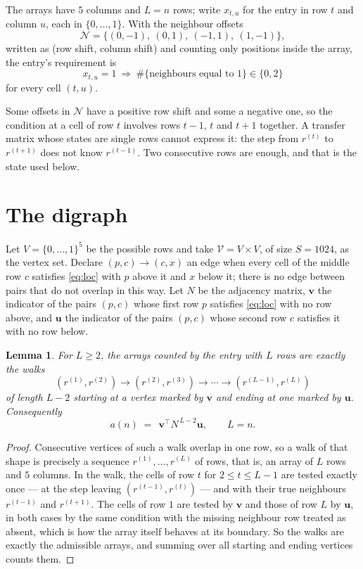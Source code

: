 \documentclass[11pt,a4paper]{article}
\theoremstyle{plain}
\newtheorem{lemma}[theorem]{Lemma}
\theoremstyle{definition}
\begin{document}
The arrays have $5$ columns and $L=n$ rows; write $x_{t,u}$ for the entry in
row $t$ and column $u$, each in $\{0,\dots,1\}$. With the neighbour offsets
\[
\mathcal N=\{(0,-1),\ (0,1),\ (-1,1),\ (1,-1)\},
\]
written as (row shift, column shift) and counting only positions inside the array, the
entry's requirement is
\begin{equation}\label{eq:loc}
x_{t,u}=1\ \Rightarrow\ \#\{\text{neighbours equal to }1\}\in\{0,2\}
\end{equation}
for every cell $(t,u)$.

Some offsets in $\mathcal N$ have a positive row shift and some a negative one, so the
condition at a cell of row $t$ involves rows $t-1$, $t$ and $t+1$ together. A transfer
matrix whose states are single rows cannot express it: the step from $r^{(t)}$ to
$r^{(t+1)}$ does not know $r^{(t-1)}$. Two consecutive rows are enough, and that is
the state used below.

\section{The digraph}

Let $V=\{0,\dots,1\}^{5}$ be the possible rows and take
$\mathcal V=V\times V$, of size $S=1024$, as the vertex set. Declare $(p,c)\to(c,x)$ an edge
when every cell of the middle row $c$ satisfies \eqref{eq:loc} with $p$ above it and $x$
below it; there is no edge between pairs that do not overlap in this way. Let $N$ be the
adjacency matrix, $\mathbf{v}$ the indicator of the pairs $(p,c)$ whose first row $p$
satisfies \eqref{eq:loc} with no row above, and $\mathbf{u}$ the indicator of
the pairs $(p,c)$ whose second row $c$ satisfies it with no row below.

\begin{lemma}\label{lem:walk}
For $L\ge2$, the arrays counted by the entry with $L$ rows are exactly the walks
\[
(r^{(1)},r^{(2)})\to(r^{(2)},r^{(3)})\to\cdots\to(r^{(L-1)},r^{(L)})
\]
of length $L-2$ starting at a vertex marked by $\mathbf{v}$ and ending at one marked by
$\mathbf{u}$. Consequently
\[
a(n)\;=\;\,\mathbf{v}^{\!\top}N^{\,L-2}\mathbf{u},\qquad L=n .
\]
\end{lemma}

\begin{proof}
Consecutive vertices of such a walk overlap in one row, so a walk of that shape is
precisely a sequence $r^{(1)},\dots,r^{(L)}$ of rows, that is, an array of $L$ rows
and $5$ columns. In the walk, the cells of row $t$ for $2\le t\le L-1$ are tested
exactly once --- at the step leaving $(r^{(t-1)},r^{(t)})$ --- and with their true
neighbours $r^{(t-1)}$ and $r^{(t+1)}$. The cells of row $1$ are tested by
$\mathbf{v}$ and those of row $L$ by $\mathbf{u}$, in both cases by the same condition
with the missing neighbour row treated as absent, which is how the array itself behaves at
its boundary. So the walks are exactly the admissible arrays, and summing over all starting
and ending vertices counts them.
\end{proof}
\end{document}
